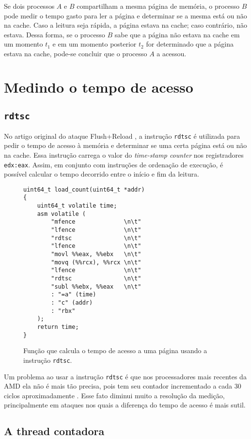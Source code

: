 \documentclass[twocolumn, 12pt]{article}
\begin{document}
Se dois processos $A$ e $B$ compartilham
a mesma página de memória,
o processo $B$ pode medir
o tempo gasto para ler a página e
determinar se a mesma
está ou não na cache.
Caso a leitura seja rápida,
a página estava na cache;
caso contrário, não estava.
Dessa forma,
se o processo $B$ sabe
que a página não estava
na cache em um momento $t_1$
e em um momento posterior $t_2$
for determinado
que a página estava na cache,
pode-se concluir que
o processo $A$ a acessou.

\section{Medindo o tempo de acesso}
\subsection{\texttt{rdtsc}}
No artigo original do ataque Flush+Reload \cite{flushreload},
a instrução \texttt{rdtsc} é utilizada para
pedir o tempo de acesso à memória
e determinar se uma certa página
está ou não na cache.
Essa instrução carrega o valor
do \textit{time-stamp counter}
nos registradores \texttt{edx:eax}.
Assim, em conjunto com instruções
de ordenação de execução,
é possível calcular o
tempo decorrido entre
o início e fim da leitura.
\begin{figure}[h]
\begin{verbatim}
uint64_t load_count(uint64_t *addr)
{
	uint64_t volatile time;
	asm volatile (
		"mfence              \n\t"
		"lfence              \n\t"
		"rdtsc               \n\t"
		"lfence              \n\t"
		"movl %%eax, %%ebx   \n\t"
		"movq (%%rcx), %%rcx \n\t"
		"lfence              \n\t"
		"rdtsc               \n\t"
		"subl %%ebx, %%eax   \n\t"
		: "=a" (time)
		: "c" (addr)
		: "rbx"
	);
	return time;
}
\end{verbatim}
\caption{Função que calcula o tempo de acesso a uma página usando a instrução \texttt{rdtsc}.}
\end{figure}

Um problema ao usar a instrução \texttt{rdtsc}
é que nos processadores mais recentes da AMD
ela não é mais tão precisa,
pois tem seu contador incrementado
a cada 30 ciclos aproximadamente \cite{takeaway}.
Esse fato diminui muito
a resolução da medição,
principalmente em ataques
nos quais a diferença
do tempo de acesso
é mais sutil.

\subsection{A thread contadora}
\end{document}
